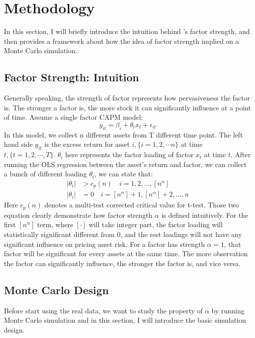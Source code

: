 \documentclass[12pt]{article}
\begin{document}
	\section{Methodology}\label{Method}
	In this section, I will briefly introduce the intuition behind \citeauthor{Bailey2020}'s factor strength, and then provides a framework about how the idea of factor strength implied on a Monte Carlo simulation.
	\subsection{Factor Strength: Intuition}\label{strength}
	Generally speaking, the strength of factor represents how pervasiveness the factor is.
	The stronger a factor is, the more stock it can significantly influence at a point of time. 
	Assume a single factor CAPM model:
	\[  y_{it} = \beta_i + \theta_{i}x_t + \epsilon_{it}  \tag{1}\label{simpleCAPM} \]
In  this model, we collect n different assets from T different time point.
The left hand  side $y_{it}$ is the excess return for asset $i, \{ i = 1, 2,\cdots n\}$ at time $t, \{t = 1, 2,\cdots, T\}$. $\theta_{i}$ here represents the factor loading of  factor $x_t$ at time $t$. 
After running the OLS regression between the asset's return and factor, we can collect a bunch of different loading $\theta_{i}$, we can state that:
\begin{align*}
|\theta_{i}| &> c_p(n)\quad i = 1, 2,  \dots, [n^{\alpha}]\\
|\theta_{i}| &= 0 \quad i = [n^{\alpha}] + 1, [n^{\alpha}] +2 ,\dots, n
\end{align*}
Here $c_p(n)$ denotes a multi-test corrected critical value for t-test. 
Those two equation clearly demonstrate how factor strength $\alpha$ is defined intuitively.
For the first $[n^{\alpha}]$ term, where $[\cdot]$ will take integer part,  the factor loading will statistically significant different from 0, and the rest loadings will not have any significant influence on pricing asset risk.
For a factor has strength $\alpha = 1$, that factor will be significant  for every assets at the same time.
The more observation the factor can significantly influence, the stronger the factor is, and vice versa.


	\subsection{Monte Carlo Design}\label{MC}
Before start using the real data, we want to study the property of $\alpha$ by running Monte Carlo simulation and in this section, I will introduce the basic simulation design.
\end{document}

